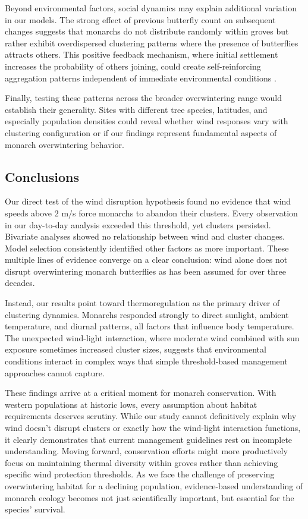 Beyond environmental factors, social dynamics may explain additional variation in our models. The strong effect of previous butterfly count on subsequent changes suggests that monarchs do not distribute randomly within groves but rather exhibit overdispersed clustering patterns where the presence of butterflies attracts others. This positive feedback mechanism, where initial settlement increases the probability of others joining, could create self-reinforcing aggregation patterns independent of immediate environmental conditions \parencite{berdahlEmergentSensingComplex2013}.

Finally, testing these patterns across the broader overwintering range would establish their generality. Sites with different tree species, latitudes, and especially population densities could reveal whether wind responses vary with clustering configuration or if our findings represent fundamental aspects of monarch overwintering behavior.

\subsection{Conclusions}

Our direct test of the wind disruption hypothesis found no evidence that wind speeds above 2 m/s force monarchs to abandon their clusters. Every observation in our day-to-day analysis exceeded this threshold, yet clusters persisted. Bivariate analyses showed no relationship between wind and cluster changes. Model selection consistently identified other factors as more important. These multiple lines of evidence converge on a clear conclusion: wind alone does not disrupt overwintering monarch butterflies as has been assumed for over three decades.

Instead, our results point toward thermoregulation as the primary driver of clustering dynamics. Monarchs responded strongly to direct sunlight, ambient temperature, and diurnal patterns, all factors that influence body temperature. The unexpected wind-light interaction, where moderate wind combined with sun exposure sometimes increased cluster sizes, suggests that environmental conditions interact in complex ways that simple threshold-based management approaches cannot capture.

These findings arrive at a critical moment for monarch conservation. With western populations at historic lows, every assumption about habitat requirements deserves scrutiny. While our study cannot definitively explain why wind doesn't disrupt clusters or exactly how the wind-light interaction functions, it clearly demonstrates that current management guidelines rest on incomplete understanding. Moving forward, conservation efforts might more productively focus on maintaining thermal diversity within groves rather than achieving specific wind protection thresholds. As we face the challenge of preserving overwintering habitat for a declining population, evidence-based understanding of monarch ecology becomes not just scientifically important, but essential for the species' survival.